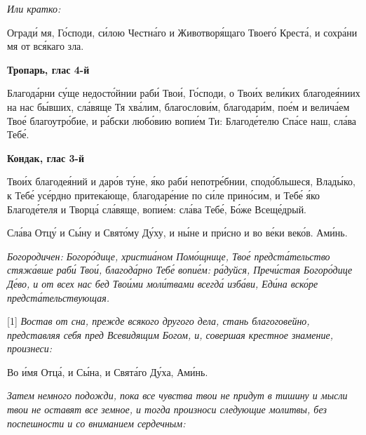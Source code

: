  \itshape Или кратко:\normalfont{}


   Огради́ мя, Го́споди, си́лою Честна́го и Животворя́щаго Твоего́ Креста́, и
сохра́ни мя от вся́каго зла.

   


\mychapterending







\bfseries Тропарь, глас 4-й\normalfont{}


   Благода́рни су́ще недосто́йнии раби́ Твои́, Го́споди, о Твои́х вели́ких
благодея́ниих на нас бы́вших, сла́вяще Тя хва́лим, благослови́м, благодари́м,
пое́м и велича́ем Твое́ благоутро́бие, и ра́бски любо́вию вопие́м Ти:
Благоде́телю Спа́се наш, сла́ва Тебе́.



 

\bfseries Кондак, глас 3-й\normalfont{}


   Твои́х благодея́ний и даро́в ту́не, я́ко раби́ непотре́бнии, сподо́бльшеся,
Влады́ко, к Тебе́ усе́рдно притека́юще, благодаре́ние по си́ле прино́сим, и
Тебе́ я́ко Благоде́теля и Творца́ сла́вяще, вопие́м: сла́ва Тебе́, Бо́же
Всеще́дрый.


   Сла́ва Отцу́ и Сы́ну и Свято́му Ду́ху, и ны́не и при́сно и во ве́ки веко́в.
Ами́нь.


 \itshape Богородичен:\normalfont{} Богоро́дице, христиа́ном Помо́щнице, Твое́ предста́тельство
стяжа́вше раби́ Твои́, благода́рно Тебе́ вопие́м: ра́дуйся, Пречи́стая
Богоро́дице Де́во, и от всех нас бед Твои́ми моли́твами всегда́ изба́ви, Еди́на
вско́ре предста́тельствующая.

   


\mychapterending





[1]
\itshape Востав от сна, прежде всякого другого дела, стань благоговейно,
представляя себя пред Всевидящим Богом, и, совершая крестное знамение,
произнеси:\normalfont{}


   Во и́мя Отца́, и Сы́на, и Свята́го Ду́ха, Ами́нь.


 \itshape Затем немного подожди, пока все чувства твои не придут в тишину и
мысли твои не оставят все земное, и тогда произноси следующие молитвы,
без поспешности и со вниманием сердечным:\normalfont{}



